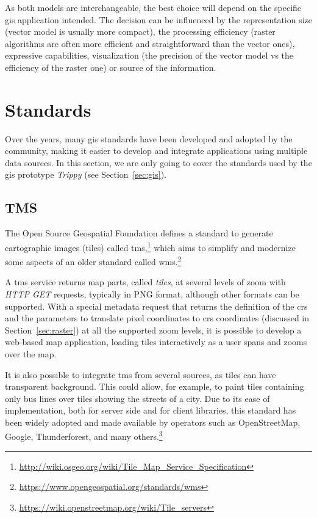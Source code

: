     As both models are interchangeable, the best choice will depend on the specific \gls{gis} application intended. The decision can be influenced by the representation size (vector model is usually more compact), the processing efficiency (raster algorithms are often more efficient and straightforward than the vector ones), expressive capabilities, visualization (the precision of the vector model vs the efficiency of the raster one) or source of the information.
    
    \section{Standards}
    \label{sec:gis:std}
    Over the years, many \gls{gis} standards have been developed and adopted by the community, making it easier to develop and integrate applications using multiple data sources. In this section, we are only going to cover the standards used by the \gls{gis} prototype {\em Trippy} (see Section~\ref{sec:gis}).
    
    \subsection{TMS}
    The Open Source Geospatial Foundation defines a standard to generate cartographic images (tiles) called \gls{tms},\footnote{\url{http://wiki.osgeo.org/wiki/Tile_Map_Service_Specification}} which aims to simplify and modernize some aspects of an older standard called \gls{wms}.\footnote{\url{https://www.opengeospatial.org/standards/wms}}
    
    A \gls{tms} service returns map parts, called \textit{tiles}, at several levels of zoom with {\em HTTP GET} requests, typically in PNG format, although other formats can be supported. With a special metadata request that returns the definition of the \gls{crs} and the parameters to translate pixel coordinates to \gls{crs} coordinates (discussed in Section~\ref{sec:raster}) at all the supported zoom levels, it is possible to develop a \mbox{web-based} map application, loading tiles interactively as a user spans and zooms over the map.
    
    It is also possible to integrate \gls{tms} from several sources, as tiles can have transparent background. This could allow, for example, to paint tiles containing only bus lines over tiles showing the streets of a city. Due to its ease of implementation, both for server side and for client libraries, this standard has been widely adopted and made available by operators such as OpenStreetMap, Google, Thunderforest, and many others.\footnote{\url{https://wiki.openstreetmap.org/wiki/Tile_servers}}
    
